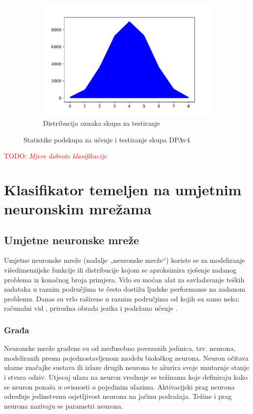 \documentclass[times, utf8, numeric, diplomski]{fer}
\def\TODO#1{\noindent\textcolor{red}{TODO: \textit{#1}}\newline}
\def\todo#1{\TODO{#1}}
\begin{document}
\begin{figure}[H]
\begin{subfigure}{.5\textwidth}
\includegraphics[width=\textwidth]{nl9_ts_outputs.pdf}
\centering
\caption{Distribucija oznaka skupa za testiranje}
\label{fig:dpa4_test_outputs}
\end{subfigure}
\caption{Statistike podskupa za učenje i testiranje skupa DPAv4}
\end{figure}

\todo{Mjere dobrote klasifikacije}

\chapter{Klasifikator temeljen na umjetnim neuronskim mrežama}

\section{Umjetne neuronske mreže}
Umjetne neuronske mreže (nadalje „neuronske mreže“) koriste se za modeliranje višedimenzijske funkcije ili distribucije kojom se aproksimira rješenje zadanog problema iz konačnog broja primjera. Vrlo su moćan alat za savladavanje teških zadataka u raznim područjima te često dostižu ljudske performanse na zadanom problemu. Danas su vrlo raširene u raznim područjima od kojih su samo neka: računalni vid \citep{alexnet,yolo}, prirodna obrada jezika \citep{word2vec,char_cnn} i podržano učenje \citep{atari,active_learn}.

\subsection{Građa}
Neuronske mreže građene su od međusobno povezanih jedinica, tzv. neurona, modeliranih prema pojednostavljenom modelu biološkog neurona. Neuron očitava ulazne značajke sustava ili izlaze drugih neurona te ažurira svoje unutarnje stanje i stvara odziv. Utjecaj ulaza na neuron vrednuje se težinama  koje definiraju kako se neuron ponaša u ovisnosti o pojedinim ulazima. Aktivacijski prag neurona  određuje jedinstvenu osjetljivost neurona na jačinu podražaja. Težine i prag neurona nazivaju se parametri neurona.
\end{document}
